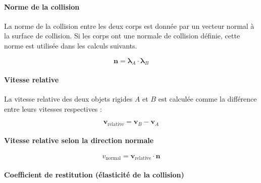     \paragraph{Norme de la collision}
    La norme de la collision entre les deux corps est donnée par un vecteur
    normal à la surface de collision. Si les corps ont une normale de
    collision définie, cette norme est utilisée dans les calculs suivants.


    \begin{equation}
    \mathbf{n} = \mathbf{\lambda}_A \cdot \mathbf{\lambda}_B
    \end{equation}

    \paragraph{Vitesse relative}
    La vitesse relative des deux objets rigides \( A \) et \( B \) est calculée
    comme la différence entre leurs vitesses respectives :


    \begin{equation}
    \mathbf{v}_{\text{relative}} = \mathbf{v}_B - \mathbf{v}_A
    \end{equation}

    \paragraph{Vitesse relative selon la direction normale}

    \begin{equation}
    v_{\text{normal}} = \mathbf{v}_{\text{relative}} \cdot \mathbf{n}
    \end{equation}

    \paragraph{Coefficient de restitution (élasticité de la collision)}

